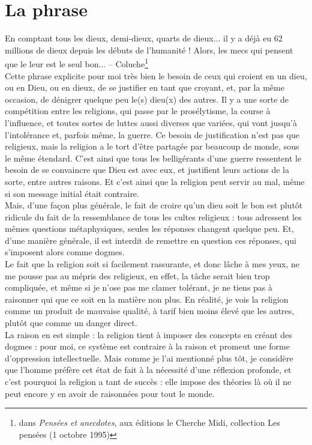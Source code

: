 \documentclass[12pt,a4paper]{article}
\begin{document}
{\part{La phrase}

\og{}En comptant tous les dieux, demi-dieux, quarts de dieux... il y a déjà eu 62 millions de dieux depuis les débuts de l'humanité ! Alors, les mecs qui pensent que le leur est le seul bon...\fg{} -- Coluche\footnote{dans \emph{Pensées et anecdotes}, aux éditions le Cherche Midi, collection \og{}Les pensées\fg{} (1 octobre 1995)}\\

Cette phrase explicite pour moi très bien le besoin de ceux qui croient en un dieu, ou en Dieu, ou en dieux, de se justifier en tant que croyant, et, par la même occasion, de dénigrer quelque peu le(s) dieu(x) des autres. Il y a une sorte de compétition entre les religions, qui passe par le prosélytisme, la course à l'influence, et toutes sortes de luttes aussi diverses que variées, qui vont jusqu'à l'intolérance et, parfois même, la guerre. Ce besoin de justification n'est pas que religieux, mais la religion a le tort d'être partagée par beaucoup de monde, sous le même \og{}étendard\fg{}. C'est ainsi que tous les belligérants d'une guerre ressentent le besoin de se convaincre que Dieu est avec eux, et justifient leurs actions de la sorte, entre autres raisons. Et c'est ainsi que la religion peut servir au mal, même si son message initial était contraire.\\

Mais, d'une façon plus générale, le fait de croire qu'un dieu soit le bon est plutôt ridicule du fait de la ressemblance de tous les cultes religieux : tous adressent les mêmes questions métaphysiques, seules les réponses changent quelque peu. Et, d’une manière générale, il est interdit de remettre en question ces réponses, qui s’imposent alors comme dogmes.\\

Le fait que la religion soit si facilement rassurante, et donc lâche à mes yeux, ne me pousse pas au mépris des religieux, en effet, la tâche serait bien trop compliquée, et même si je n'ose pas me clamer tolérant, je ne tiens pas à raisonner qui que ce soit en la matière non plus. En réalité, je vois la religion comme un produit de mauvaise qualité, à tarif bien moins élevé que les autres, plutôt que comme un danger direct.\\

La raison en est simple : la religion tient à imposer des concepts en créant des dogmes : pour moi, ce système est contraire à la raison et promeut une forme d'oppression intellectuelle. Mais comme je l'ai mentionné plus tôt, je considère que l'homme préfère cet état de fait à la nécessité d'une réflexion profonde, et c'est pourquoi la religion a tant de succès : elle impose des théories là où il ne peut encore y en avoir de raisonnées pour tout le monde.\\

}
\end{document}
